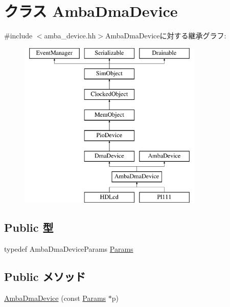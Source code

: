 \hypertarget{classAmbaDmaDevice}{
\section{クラス AmbaDmaDevice}
\label{classAmbaDmaDevice}
}


{\ttfamily \#include $<$amba\_\-device.hh$>$}AmbaDmaDeviceに対する継承グラフ:\begin{figure}[H]
\begin{center}
\leavevmode
\includegraphics[height=8cm]{classAmbaDmaDevice}
\end{center}
\end{figure}
\subsection*{Public 型}
\begin{DoxyCompactItemize}
\item 
typedef AmbaDmaDeviceParams \hyperlink{classAmbaDmaDevice_ab612ceb7381438552927b7ed0aed5099}{Params}
\end{DoxyCompactItemize}
\subsection*{Public メソッド}
\begin{DoxyCompactItemize}
\item 
\hyperlink{classAmbaDmaDevice_a5dc78ee7b28b4b3effe7e28b09e6db48}{AmbaDmaDevice} (const \hyperlink{classAmbaDmaDevice_ab612ceb7381438552927b7ed0aed5099}{Params} $\ast$p)
\end{DoxyCompactItemize}
